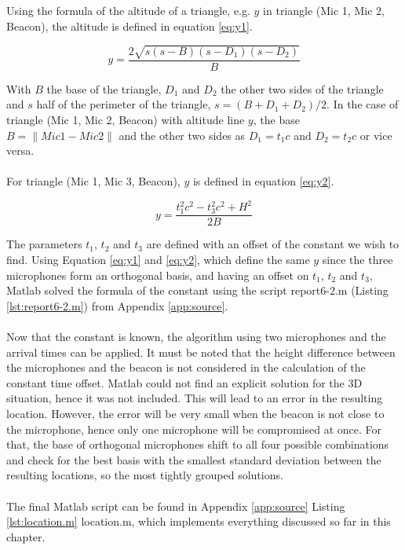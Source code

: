 \documentclass[final]{scrreprt} %
\begin{document}
Using the formula of the altitude of a triangle, e.g. $y$ in triangle (Mic 1, Mic 2, Beacon), the altitude is defined in equation \ref{eq:y1}.

\begin{equation}
	y = \frac{2 \sqrt{s(s - B)(s - D_1)(s - D_2)}}{B}
\label{eq:y1}
\end{equation}

With $B$ the base of the triangle, $D_1$ and $D_2$ the other two sides of the triangle and $s$ half of the perimeter of the triangle, $s = (B + D_1 + D_2) / 2$.
In the case of triangle (Mic 1, Mic 2, Beacon) with altitude line $y$, the base $B = \lVert Mic 1 - Mic 2 \rVert$ and the other two sides as $D_1 = t_1 c$ and $D_2 = t_2 c$ or vice versa.
\\ \\
For triangle (Mic 1, Mic 3, Beacon), $y$ is defined in equation \ref{eq:y2}.

\begin{equation}
	y = \frac{t_1^2 c^2 - t_3^2 c^2 + H^2}{2 B}
\label{eq:y2}
\end{equation}

The parameters $t_1$, $t_2$ and $t_3$ are defined with an offset of the constant we wish to find.
Using Equation \ref{eq:y1} and \ref{eq:y2}, which define the same $y$ since the three microphones form an orthogonal basis, and having an offset on $t_1$, $t_2$ and $t_3$, Matlab solved the formula of the constant using the script report6-2.m (Listing \ref{lst:report6-2.m}) from Appendix \ref{app:source}.
\\ \\
Now that the constant is known, the algorithm using two microphones and the arrival times can be applied.
It must be noted that the height difference between the microphones and the beacon is not considered in the calculation of the constant time offset.
Matlab could not find an explicit solution for the 3D situation, hence it was not included.
This will lead to an error in the resulting location.
However, the error will be very small when the beacon is not close to the microphone, hence only one microphone will be compromised at once.
For that, the base of orthogonal microphones shift to all four possible combinations and check for the best basis with the smallest standard deviation between the resulting locations, so the most tightly grouped solutions.
\\ \\
The final Matlab script can be found in Appendix \ref{app:source} Listing \ref{lst:location.m} location.m, which implements everything discussed so far in this chapter.
\end{document}
